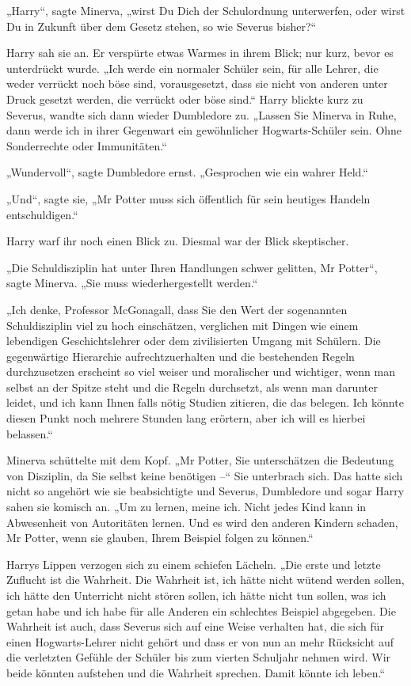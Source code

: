 {„Harry“, sagte Minerva, „wirst Du Dich der Schulordnung unterwerfen, oder wirst Du in Zukunft über dem Gesetz stehen, so wie Severus bisher?“

Harry sah sie an. Er verspürte etwas Warmes in ihrem Blick; nur kurz, bevor es unterdrückt wurde. „Ich werde ein normaler Schüler sein, für alle Lehrer, die weder verrückt noch böse sind, vorausgesetzt, dass sie nicht von anderen unter Druck gesetzt werden, die verrückt oder böse sind.“ Harry blickte kurz zu Severus, wandte sich dann wieder Dumbledore zu. „Lassen Sie Minerva in Ruhe, dann werde ich in ihrer Gegenwart ein gewöhnlicher Hogwarts-Schüler sein. Ohne Sonderrechte oder Immunitäten.“

„Wundervoll“, sagte Dumbledore ernst. „Gesprochen wie ein wahrer Held.“

„Und“, sagte sie, „Mr Potter muss sich öffentlich für sein heutiges Handeln entschuldigen.“

Harry warf ihr noch einen Blick zu. Diesmal war der Blick skeptischer.

„Die Schuldisziplin hat unter Ihren Handlungen schwer gelitten, Mr Potter“, sagte Minerva. „Sie muss wiederhergestellt werden.“

„Ich denke, Professor McGonagall, dass Sie den Wert der sogenannten Schuldisziplin viel zu hoch einschätzen, verglichen mit Dingen wie einem lebendigen Geschichtslehrer oder dem zivilisierten Umgang mit Schülern. Die gegenwärtige Hierarchie aufrechtzuerhalten und die bestehenden Regeln durchzusetzen erscheint so viel weiser und moralischer und wichtiger, wenn man selbst an der Spitze steht und die Regeln durchsetzt, als wenn man darunter leidet, und ich kann Ihnen falls nötig Studien zitieren, die das belegen. Ich könnte diesen Punkt noch mehrere Stunden lang erörtern, aber ich will es hierbei belassen.“

Minerva schüttelte mit dem Kopf. „Mr Potter, Sie unterschätzen die Bedeutung von Disziplin, da Sie selbst keine benötigen --“ Sie unterbrach sich. Das hatte sich nicht so angehört wie sie beabsichtigte und Severus, Dumbledore und sogar Harry sahen sie komisch an. „Um zu lernen, meine ich. Nicht jedes Kind kann in Abwesenheit von Autoritäten lernen. Und es wird den anderen Kindern schaden, Mr Potter, wenn sie glauben, Ihrem Beispiel folgen zu können.“

Harrys Lippen verzogen sich zu einem schiefen Lächeln. „Die erste und letzte Zuflucht ist die Wahrheit. Die Wahrheit ist, ich hätte nicht wütend werden sollen, ich hätte den Unterricht nicht stören sollen, ich hätte nicht tun sollen, was ich getan habe und ich habe für alle Anderen ein schlechtes Beispiel abgegeben. Die Wahrheit ist auch, dass Severus sich auf eine Weise verhalten hat, die sich für einen Hogwarts-Lehrer nicht gehört und dass er von nun an mehr Rücksicht auf die verletzten Gefühle der Schüler bis zum vierten Schuljahr nehmen wird. Wir beide könnten aufstehen und die Wahrheit sprechen. Damit könnte ich leben.“

}
